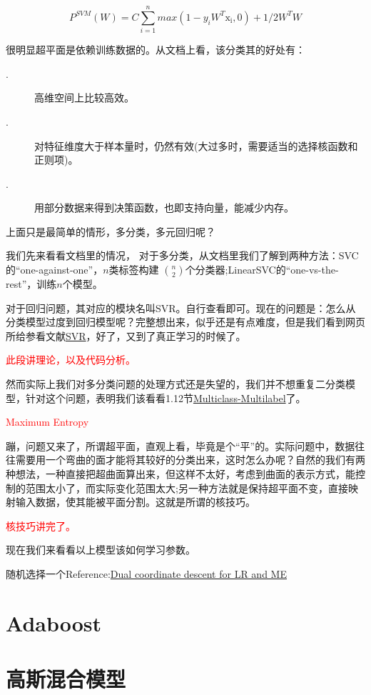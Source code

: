 \begin{equation}
    P^{SVM}(W)=C\sum_{i=1}^{n}max(1-y_iW^{T}\mathrm{x_i},0)+1/2W^{T}W
\end{equation}

很明显超平面是依赖训练数据的。从文档上看，该分类其的好处有：

    \begin{description}
        \item[.] 高维空间上比较高效。
        \item[.] 对特征维度大于样本量时，仍然有效(大过多时，需要适当的选择核函数和正则项)。
        \item[.] 用部分数据来得到决策函数，也即支持向量，能减少内存。
    \end{description}

上面只是最简单的情形，多分类，多元回归呢？

我们先来看看文档里的情况，
对于多分类，从文档里我们了解到两种方法：SVC的“one-against-one”，$n$类标签构建
$\binom{n}{2}$个分类器;LinearSVC的“one-vs-the-rest”，训练$n$个模型。

对于回归问题，其对应的模块名叫SVR。自行查看即可。现在的问题是：怎么从分类模型过度到回归模型呢？完整想出来，似乎还是有点难度，但是我们看到网页所给参看文献\href{http://citeseerx.ist.psu.edu/viewdoc/summary?doi=10.1.1.114.4288}{SVR}，好了，又到了真正学习的时候了。

\textcolor{red}{此段讲理论，以及代码分析。}

然而实际上我们对多分类问题的处理方式还是失望的，我们并不想重复二分类模型，针对这个问题，表明我们该看看1.12节\href{http://scikit-learn.org/stable/modules/multiclass.html}{Multiclass-Multilabel}了。

\textcolor{red}{Maximum Entropy}

蹦，问题又来了，所谓超平面，直观上看，毕竟是个“平”的。实际问题中，数据往往需要用一个弯曲的面才能将其较好的分类出来，这时怎么办呢？自然的我们有两种想法，一种直接把超曲面算出来，但这样不太好，考虑到曲面的表示方式，能控制的范围太小了，而实际变化范围太大;另一种方法就是保持超平面不变，直接映射输入数据，使其能被平面分割。这就是所谓的核技巧。

\textcolor{red}{核技巧讲完了。}

现在我们来看看以上模型该如何学习参数。

随机选择一个Reference:\href{http://www.csie.ntu.edu.tw/~cjlin/papers/maxent_dual.pdf}{Dual coordinate descent for LR and ME}

\section*{Adaboost}
\label{sec:Adaboost}

\section*{高斯混合模型}

\endinput